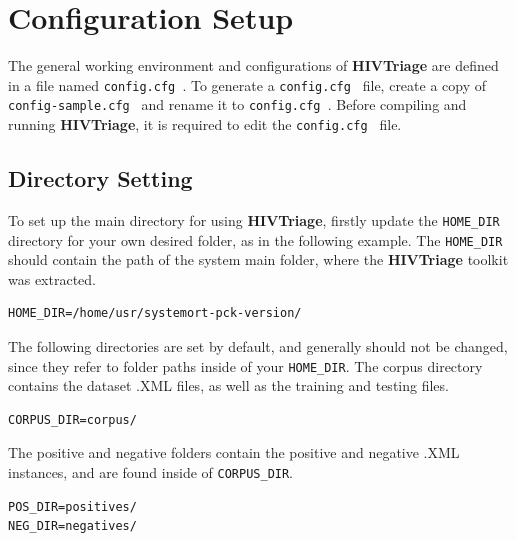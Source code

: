 \documentclass[11pt]{article}
\newcommand{\system}{{\bf{HIVTriage}}}
\newcommand{\configfile}{\texttt{config.cfg{ }}}
\newcommand{\configsample}{\texttt{config-sample.cfg{ }}}
\begin{document}
% 

\section{Configuration Setup}
\label{sec:configuration}
The general working environment and configurations of \system{} are defined in a file named \configfile{}.
To generate a \configfile{} file, create a copy of \configsample{} and rename it to \configfile{}.
Before compiling and running \system{}, it is required to edit the \configfile{} file.

\subsection{Directory Setting}
\label{directory}
To set up the main directory for using \system{}, firstly update the \texttt{HOME\_DIR} directory for your own desired folder, as in the following example.
The \texttt{HOME\_DIR} should contain the path of the system main folder, where the \system{} toolkit was extracted.
\begin{lstlisting}
HOME_DIR=/home/usr/systemort-pck-version/
\end{lstlisting}

The following directories are set by default, and generally should not be changed, 
since they refer to folder paths inside of your \texttt{HOME\_DIR}.
The corpus directory contains the dataset .XML files, as well as the training and testing files.
\begin{lstlisting}
CORPUS_DIR=corpus/
\end{lstlisting}

The positive and negative folders contain the positive and negative .XML instances, and are found inside of \texttt{CORPUS\_DIR}.
\begin{lstlisting}
POS_DIR=positives/
NEG_DIR=negatives/
\end{lstlisting}
\end{document}
